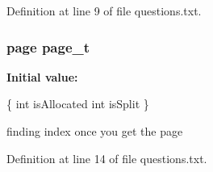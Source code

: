 Definition at line 9 of file questions.\+txt.

\subsubsection[{\texorpdfstring{page\+\_\+t}{page_t}}]{ page {\bf page\+\_\+t}}\hypertarget{questions_8txt_a9e16af15ab7a6b1c0a466dd5d684ff81}{}\label{questions_8txt_a9e16af15ab7a6b1c0a466dd5d684ff81}
{\bfseries Initial value\+:}
\begin{DoxyCode}
\{
    \textcolor{keywordtype}{int} isAllocated
    \textcolor{keywordtype}{int} isSplit
\}


finding index
once you \textcolor{keyword}{get} the page
\end{DoxyCode}


Definition at line 14 of file questions.\+txt.

